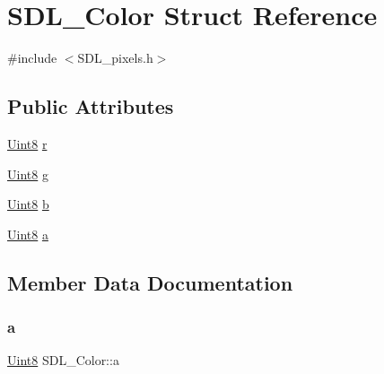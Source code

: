 \hypertarget{struct_s_d_l___color}{}\section{S\+D\+L\+\_\+\+Color Struct Reference}
\label{struct_s_d_l___color}


{\ttfamily \#include $<$S\+D\+L\+\_\+pixels.\+h$>$}

\subsection*{Public Attributes}
\begin{DoxyCompactItemize}
\item 
\hyperlink{_s_d_l__stdinc_8h_a2944638813a090aa23e62f4da842c3e2}{Uint8} \hyperlink{struct_s_d_l___color_a0bb975b6829524133fdd3c6060cfa63d}{r}
\item 
\hyperlink{_s_d_l__stdinc_8h_a2944638813a090aa23e62f4da842c3e2}{Uint8} \hyperlink{struct_s_d_l___color_ae29d881bf740cfa7078b36e07f85d298}{g}
\item 
\hyperlink{_s_d_l__stdinc_8h_a2944638813a090aa23e62f4da842c3e2}{Uint8} \hyperlink{struct_s_d_l___color_a3b79a27e0414049559aa5bcf241dedd3}{b}
\item 
\hyperlink{_s_d_l__stdinc_8h_a2944638813a090aa23e62f4da842c3e2}{Uint8} \hyperlink{struct_s_d_l___color_ac497ba67af6ecb4d51bdd0945b314526}{a}
\end{DoxyCompactItemize}


\subsection{Member Data Documentation}
\mbox{\label{struct_s_d_l___color_ac497ba67af6ecb4d51bdd0945b314526}} 
\subsubsection{\texorpdfstring{a}{a}}
{\footnotesize\ttfamily \hyperlink{_s_d_l__stdinc_8h_a2944638813a090aa23e62f4da842c3e2}{Uint8} S\+D\+L\+\_\+\+Color\+::a}

\mbox{\label{struct_s_d_l___color_a3b79a27e0414049559aa5bcf241dedd3}} 
